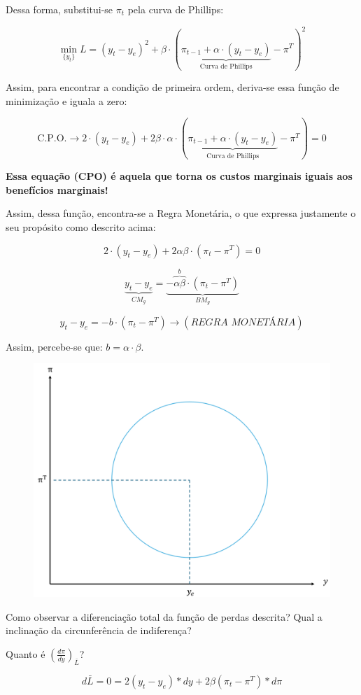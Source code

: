 \documentclass[a4paper,12pt]{article}[abntex2]
\begin{document}
Dessa forma, substitui-se $\pi_t$ pela curva de Phillips:

\[
\min_{\{y_t\}} L = (y_t - y_e)^2 + \beta \cdot (\underbrace{\pi_{t-1} + \alpha \cdot (y_t - y_e)}_\text{Curva de Phillips} - \pi^T)^2
\]

Assim, para encontrar a condição de primeira ordem, deriva-se essa função de minimização e iguala a zero:

\[
\text{C.P.O.} \rightarrow 2 \cdot (y_t - y_e) + 2\beta \cdot \alpha \cdot (\underbrace{\pi_{t-1} + \alpha \cdot (y_t - y_e)}_\text{Curva de Phillips} - \pi^T) = 0
\]

\textbf{Essa equação (CPO) é aquela que torna os custos marginais iguais aos benefícios marginais!}

Assim, dessa função, encontra-se a Regra Monetária, o que expressa justamente o seu propósito como descrito acima:

\[
2 \cdot (y_t - y_e) + 2\alpha \beta \cdot (\pi_t - \pi^T) = 0
\]

\[
\underbrace{y_t - y_e}_{CM_g} = \underbrace{-\overbrace{\alpha \beta}^{b} \cdot (\pi_t - \pi^T)}_{BM_g}
\]

\[
y_t - y_e = -b \cdot (\pi_t - \pi^T) \rightarrow (\textit{REGRA MONETÁRIA})
\]

Assim, percebe-se que: \( b = \alpha \cdot \beta \).
\begin{figure}[H]
    \centering
    \includegraphics[width=0.7\linewidth]{Imagens/a15i2.png}
\end{figure}

Como observar a diferenciação total da função de perdas descrita? Qual a inclinação da circunferência de indiferença?

Quanto é \(\left(\frac{d\pi}{dy}\right)_{\bar{L}} \)?

\[
d\bar{L} = 0 = 2(y_t - y_e) * dy + 2\beta (\pi_t - \pi^T) * d\pi
\]
\end{document}
